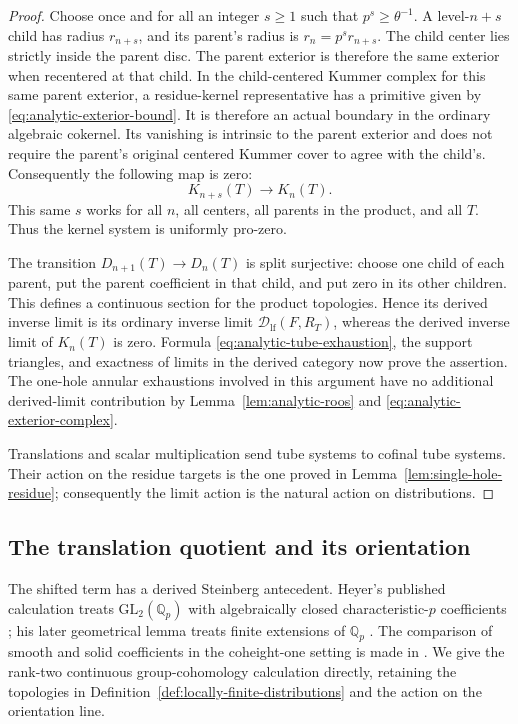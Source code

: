\begin{proof}
Choose once and for all an integer \(s\geq1\) such that
\(p^s\geq\theta^{-1}\).  A level-\(n+s\) child has radius
\(r_{n+s}\), and its parent's radius is \(r_n=p^s r_{n+s}\).
The child center lies strictly inside the parent disc.  The parent
exterior is therefore the same exterior when recentered at that
child.  In the child-centered Kummer complex for this same parent
exterior, a residue-kernel representative has a primitive given
by \eqref{eq:analytic-exterior-bound}.  It is therefore an actual
boundary in the ordinary algebraic cokernel.  Its vanishing is
intrinsic to the parent exterior and does not require the
parent's original centered Kummer cover to agree with the
child's.  Consequently the following map is zero:
\[
 K_{n+s}(T)\longrightarrow K_n(T).
\]
This same \(s\) works for all \(n\), all centers, all
parents in the product, and all \(T\).  Thus the kernel system is
uniformly pro-zero.

The transition \(D_{n+1}(T)\to D_n(T)\) is split surjective:
choose one child of each parent, put the parent coefficient in
that child, and put zero in its other children.  This defines a
continuous section for the product topologies.  Hence its derived
inverse limit is its ordinary inverse limit
\(\mathcal D_{\mathrm{lf}}(F,R_T)\), whereas the derived inverse
limit of \(K_n(T)\) is zero.  Formula
\eqref{eq:analytic-tube-exhaustion}, the support triangles, and
exactness of limits in the derived category now prove the
assertion.  The one-hole annular exhaustions involved in this
argument have no additional derived-limit contribution by
Lemma~\ref{lem:analytic-roos} and
\eqref{eq:analytic-exterior-complex}.

Translations and scalar multiplication send tube systems to
cofinal tube systems.  Their action on the residue targets is the
one proved in Lemma~\ref{lem:single-hole-residue}; consequently the
limit action is the natural action on distributions.
\end{proof}

\subsection{The translation quotient and its orientation}

The shifted term has a derived Steinberg antecedent. Heyer's published
calculation treats $\mathrm{GL}_2(\mathbb Q_p)$ with algebraically closed
characteristic-$p$ coefficients \citep[Corollary~5.3.4]{Heyer23}; his later
geometrical lemma treats finite extensions of $\mathbb Q_p$
\citep[Lemma~4.1.6 and Corollary~4.3.10]{HeyerGeo24}.
The comparison of smooth and solid coefficients in the coheight-one setting
is made in \citet[Sections~3.5--3.6]{BMR26}.
We give the rank-two continuous group-cohomology calculation directly,
retaining the topologies in Definition~\ref{def:locally-finite-distributions}
and the action on the orientation line.

